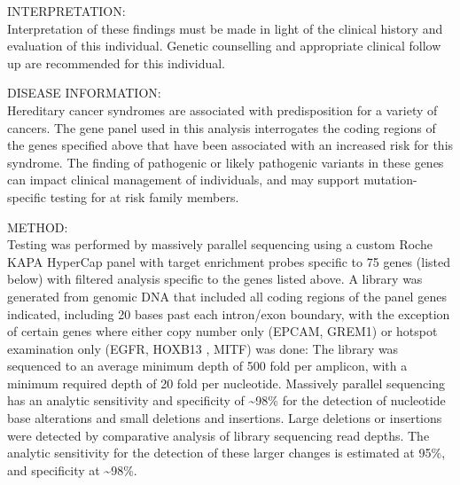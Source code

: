 \documentclass[10pt]{article}
\newcommand{\data}[1]{}
\begin{document}
INTERPRETATION: \\
\data{plugin:long_blurb}

Interpretation of these findings must be made in light of the clinical history and evaluation of this individual. Genetic counselling and appropriate clinical follow up are recommended for this individual.

DISEASE INFORMATION: \\
Hereditary cancer syndromes are associated with predisposition for a variety of cancers. The gene panel used in this analysis interrogates the coding regions of the genes specified above that have been associated with an increased risk for this syndrome. The finding of pathogenic or likely pathogenic variants in these genes can impact clinical management of individuals, and may support mutation-specific testing for at risk family members.

METHOD: \\
Testing was performed by massively parallel sequencing using a custom Roche KAPA HyperCap panel with target enrichment probes specific to 75 genes (listed below) with filtered analysis specific to the genes listed above. A library was generated from genomic DNA that included all coding regions of the panel genes indicated, including 20 bases past each intron/exon boundary, with the exception of certain genes where either copy number only (EPCAM, GREM1) or hotspot examination only (EGFR, HOXB13 , MITF) was done: The library was sequenced to an average minimum depth of 500 fold per amplicon, with a minimum required depth of 20 fold per nucleotide. Massively parallel sequencing has an analytic sensitivity and specificity of \textasciitilde 98\% for the detection of nucleotide base alterations and small deletions and insertions. Large deletions or insertions were detected by comparative analysis of library sequencing read depths. The analytic sensitivity for the detection of these larger changes is estimated at 95\%, and specificity at \textasciitilde 98\%.
\end{document}
